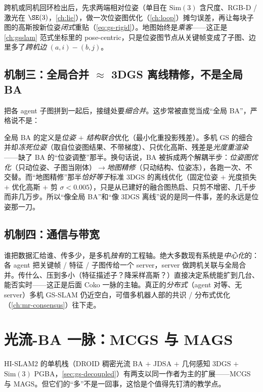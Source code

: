 跨机或同机回环检出后，先求两端相对位姿（单目在 $\mathrm{Sim}(3)$ 含尺度、RGB-D / 激光在 $\SE(3)$，\cref{ch:lie}），做一次位姿图优化（\cref{ch:loop}）摊匀误差，再让每块子图的高斯按新位姿\emph{闭式}重贴（\cref{eq:gs-rigid}）。地图始终是\emph{乘客}——这正是 \cref{ch:gsslam} 范式坐标里的 pose-centric，只是位姿图节点从关键帧变成了子图、边里多了\emph{跨机边} $(a,i)\!-\!(b,j)$。

\subsection{机制三：全局合并 \texorpdfstring{$\approx$}{=} 3DGS 离线精修，不是全局 BA}

把各 agent 子图拼到一起后，接缝处要\emph{细合并}。这步常被直觉当成“全局 BA”，严格说不是：

\begin{insight}
全局 BA 的定义是\emph{位姿 $+$ 结构联合}优化（最小化重投影残差）。多机 GS 的细合并却\emph{冻死位姿}（取自位姿图结果、不带梯度）、只优化高斯、残差是\emph{光度重渲染}——缺了 BA 的“位姿调整”那半。换句话说，BA 被拆成两个解耦半步：\emph{位姿图优化}（只动位姿、子图当刚体）$\to$\emph{地图精修}（只动结构、位姿冻），各跑一次、不交替。而“地图精修”那半\emph{恰好等于}标准 3DGS 的离线优化（固定位姿 $+$ 光度损失 $+$ 优化高斯 $+$ 剪 $\sigma\!<\!0.005$），只是从已建好的融合图热启、只剪不增密、几千步而非几万步。所以“像全局 BA”和“像 3DGS 离线”说的是同一件事，差的永远是位姿那一刀。
\end{insight}

\subsection{机制四：通信与带宽}

谁把数据汇给谁、传多少，是多机\emph{独有}的工程轴。绝大多数现有系统是\emph{中心化}的：各 agent 把关键帧 / 特征 / 子图传给一个 server，server 做跨机关联与全局合并。传什么、压到多小（特征描述子？降采样高斯？）直接决定系统能扩到几台、能否实时——这正是后面 Coko 一脉的主轴。真正的\emph{分布式}（agent 对等、无 server）多机 GS-SLAM 仍近空白，可借多机器人部的共识 / 分布式优化（\cref{ch:mr-consensus}）往下走。

\section{光流-BA 一脉：MCGS 与 MAGS}
\label{sec:mags-flowba}

HI-SLAM2 的单机栈（DROID 稠密光流 BA $+$ JDSA $+$ 几何感知 3DGS $+$ $\mathrm{Sim}(3)$ PGBA，\cref{sec:gs-decoupled}）有两支以同一作者为主的扩展——MCGS 与 MAGS。但它们的“多”不是一回事，这恰是个值得先钉清的教学点。

